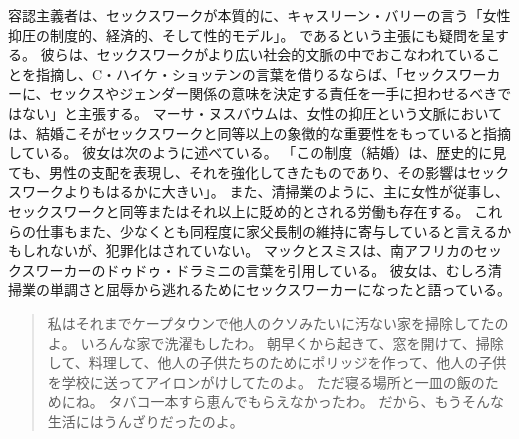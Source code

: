 \documentclass[paper=a4,book,openany]{jlreq}
\newcommand{\ig}[1]{}           %
\begin{document}
容認主義者は、セックスワークが本質的に、キャスリーン・バリー\ig{Barry}の言う「女性抑圧の制度的、経済的、そして性的モデル」\citep[p.24]{barry95:_prost_sexual}。
であるという主張にも疑問を呈する。
彼らは、セックスワークがより広い社会的文脈の中でおこなわれていることを指摘し、C・ハイケ・ショッテンの言葉を借りるならば、「セックスワーカーに、セックスやジェンダー関係の意味を決定する責任を一手に担わせるべきではない」と主張する\citep[p.223]{schotten05:_men_mascul_male_domin}。
マーサ・ヌスバウムは、女性の抑圧という文脈においては、結婚こそがセックスワークと同等以上の象徴的な重要性をもっていると指摘している。
彼女は次のように述べている。
「この制度（結婚）は、歴史的に見ても、男性の支配を表現し、それを強化してきたものであり、その影響はセックスワークよりもはるかに大きい」\citep[p.719]{nussbaum98:_wheth_reason_prejud}。
また、清掃業のように、主に女性が従事し、セックスワークと同等またはそれ以上に貶め的とされる労働も存在する。
これらの仕事もまた、少なくとも同程度に家父長制の維持に寄与していると言えるかもしれないが、犯罪化はされていない。
マックとスミスは、南アフリカのセックスワーカーのドゥドゥ・ドラミニの言葉を引用している。
彼女は、むしろ清掃業の単調さと屈辱から逃れるためにセックスワーカーになったと語っている。

\begin{quote}
私はそれまでケープタウンで他人のクソみたいに汚ない家を掃除してたのよ。
いろんな家で洗濯もしたわ。
朝早くから起きて、窓を開けて、掃除して、料理して、他人の子供たちのためにポリッジを作って、他人の子供を学校に送ってアイロンがけしてたのよ。
ただ寝る場所と一皿の飯のためにね。
タバコ一本すら恵んでもらえなかったわ。
だから、もうそんな生活にはうんざりだったのよ。
\citep[p.49]{mac18:_revol_prost}
\end{quote}
\end{document}
